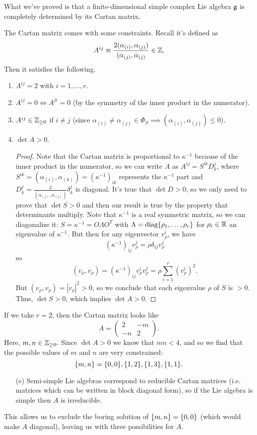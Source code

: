 What we've proved is that a finite-dimensional simple complex Lie algebra $\mathfrak{g}$ is completely determined by its Cartan matrix.

The Cartan matrix comes with some constraints. Recall it's defined as
$$A^{ij}\equiv \frac{2(\alpha_{(i)}, \alpha_{(j)})} {(\alpha_{(j)},\alpha_{(j)}}\in \mathbb{Z},$$
Then it satisfies the following.
\begin{enumerate}
    \item $A^{ij}=2$ with $i=1,\ldots,r$.
    \item $A^{ij}=0 \iff A^{ji}=0$ (by the symmetry of the inner product in the numerator).
    \item $A^{ij}\in \mathbb{Z}_{\geq 0}$ if $i\neq j$ (since $\alpha_{(i)}\neq \alpha_{(j)} \in \Phi_S \implies (\alpha_{(i)},\alpha_{(j)})\leq 0$).
    \item $\det A > 0$. \begin{proof}
    Note that the Cartan matrix is proportional to $\kappa^{-1}$ because of the inner product in the numerator, so we can write $A$ as $A^{ij}=S^{ik} D_k^j$, where $S^{ik}=(\alpha_{(i)},\alpha_{(k)})=(\kappa^{-1})_{ik}$ represents the $\kappa^{-1}$ part and $D_k^j = \frac{2}{(\alpha_{(j)},\alpha_{(j)})}\delta_k^j$ is diagonal. It's true that $\det D >0$, so we only need to prove that $\det S >0$ and then our result is true by the property that determinants multiply. Note that $\kappa^{-1}$ is a real symmetric matrix, so we can diagonalize it: $S=\kappa^{-1}=O\Lambda O^T$ with $\Lambda = \text{diag}\{\rho_1,\ldots,\rho_r\}$ for $\rho_i\in \mathbb{R}$ an eigenvalue of $\kappa^{-1}.$ But then for any eigenvector $v_\rho^i$, we have
    $$(\kappa^{-1})_{ij}v_\rho^j = \rho \delta_{ij} v^j_\rho$$
    so
    $$(v_\rho,v_\rho)=(\kappa^{-1})_{ij} v_\rho^i v_\rho^j = \rho \sum_{i=1}^r (v_\rho^i)^2.$$ But $(v_\rho,v_\rho)= |v_\rho|^2 >0$, so we conclude that each eigenvalue $\rho$ of $S$ is $>0$. Thus, $\det S>0$, which implies $\det A >0$.
    \end{proof}
\end{enumerate}

\begin{exm}
If we take $r=2$, then the Cartan matrix looks like
$$A=\begin{pmatrix}
2&-m\\-n &2
\end{pmatrix}.$$
Here, $m,n\in \mathbb{Z}_{\geq 0}.$ Since $\det A >0$ we know that $mn <4$, and so we find that the possible values of $m$ and $n$ are very constrained:
$$\{m,n\}=\{0,0\},\{1,2\},\{1,3\},\{1,1\}.$$
\end{exm}
\begin{enumerate}
    \item[(e)] Semi-simple Lie algebras correspond to reducible Cartan matrices (i.e. matrices which can be written in block diagonal form), so if the Lie algebra is simple then $A$ is irreducible.
\end{enumerate}
This allows us to exclude the boring solution of $\{m,n\}=\{0,0\}$ (which would make $A$ diagonal), leaving us with three possibilities for $A$.

